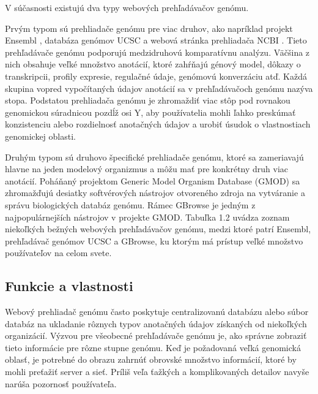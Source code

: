 V súčasnosti existujú dva typy webových prehľadávačov genómu. 

Prvým typom sú prehliadače genómu pre viac druhov, ako napríklad projekt Ensembl \cite{ENSEMBLgb}, databáza genómov UCSC \cite{UCSCgb} a webová stránka prehliadača NCBI \cite{NCBIgb}.
Tieto prehľadávače genómu podporujú medzidruhovú komparatívnu analýzu.
Väčšina z nich obsahuje veľké množstvo anotácií, ktoré zahŕňajú génový model, dôkazy o transkripcii, profily expresie, regulačné údaje, genómovú konverzáciu atď.
Každá skupina vopred vypočítaných údajov anotácií sa v prehľadávačoch genómu nazýva stopa.
Podstatou prehliadača genómu je zhromaždiť viac stôp pod rovnakou genomickou súradnicou pozdĺž osi Y, aby používatelia mohli ľahko preskúmať konzistenciu alebo rozdielnosť anotačných údajov a urobiť úsudok o vlastnostiach genomickej oblasti.

Druhým typom sú druhovo špecifické prehliadače genómu, ktoré sa zameriavajú hlavne na jeden modelový organizmus a môžu mať pre konkrétny druh viac anotácií.
Poháňaný projektom Generic Model Organism Database (GMOD) sa zhromažďujú desiatky softvérových nástrojov otvoreného zdroja na vytváranie a správu biologických databáz genómu.
Rámec GBrowse \cite{GBrowse} je jedným z najpopulárnejších nástrojov v projekte GMOD.
Tabuľka 1.2 uvádza zoznam niekoľkých bežných webových prehľadávačov genómu, medzi ktoré patrí Ensembl, prehľadávač genómov UCSC a GBrowse, ku ktorým má prístup veľké množstvo používateľov na celom svete.

\subsection{Funkcie a vlastnosti}

Webový prehliadač genómu často poskytuje centralizovanú databázu alebo súbor databáz na ukladanie rôznych typov anotačných údajov získaných od niekoľkých organizácií.
Výzvou pre všeobecné prehľadávače genómu je, ako správne zobraziť tieto informácie pre rôzne stupne genómu.
Keď je požadovaná veľká genomická oblasť, je potrebné do obrazu zahrnúť obrovské množstvo informácií, ktoré by mohli preťažiť server a sieť.
Príliš veľa ťažkých a komplikovaných detailov navyše narúša pozornosť používateľa.

